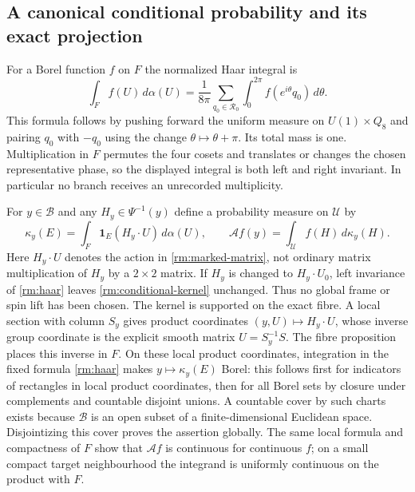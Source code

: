 \subsection{A canonical conditional probability and its exact projection}

For a Borel function $f$ on $F$ the normalized Haar integral is
\begin{equation}\label{rm:haar}
 \int_F f(U)\,d\alpha(U)
 =\frac1{8\pi}\sum_{q_0\in\mathcal R_0}
                 \int_0^{2\pi}f(e^{i\theta}q_0)\,d\theta.
\end{equation}
This formula follows by pushing forward the uniform measure on
$U(1)\times Q_8$ and pairing $q_0$ with $-q_0$ using the change
$\theta\mapsto\theta+\pi$. Its total mass is one. Multiplication in
$F$ permutes the four cosets and translates or changes the chosen
representative phase, so the displayed integral is both left and right
invariant. In particular no branch receives an unrecorded multiplicity.

For $y\in\mathcal B$ and any $H_y\in\Psi^{-1}(y)$ define a probability
measure on $\mathcal U$ by
\begin{equation}\label{rm:conditional-kernel}
 \kappa_y(E)=\int_F\mathbf1_E(H_y\cdot U)\,d\alpha(U),\qquad
 \mathcal A f(y)=\int_{\mathcal U}f(H)\,d\kappa_y(H).
\end{equation}
Here $H_y\cdot U$ denotes the action in \eqref{rm:marked-matrix}, not
ordinary matrix multiplication of $H_y$ by a $2\times2$ matrix.
If $H_y$ is changed to $H_y\cdot U_0$, left invariance of
\eqref{rm:haar} leaves \eqref{rm:conditional-kernel} unchanged. Thus
no global frame or spin lift has been chosen. The kernel is supported
on the exact fibre. A local section with column $S_y$ gives product
coordinates $(y,U)\mapsto H_y\cdot U$, whose inverse group coordinate
is the explicit smooth matrix $U=S_y^{-1}S$. The fibre proposition
places this inverse in $F$. On these local product coordinates, integration in the
fixed formula \eqref{rm:haar} makes $y\mapsto\kappa_y(E)$ Borel:
this follows first for indicators of rectangles in local product
coordinates, then for all Borel sets by closure under complements and
countable disjoint unions. A countable cover by such charts exists
because $\mathcal B$ is an open subset of a finite-dimensional
Euclidean space. Disjointizing this cover proves the assertion
globally. The same local formula and compactness of $F$ show that
$\mathcal A f$ is continuous for continuous $f$; on a small compact
target neighbourhood the integrand is uniformly continuous on the
product with $F$.

